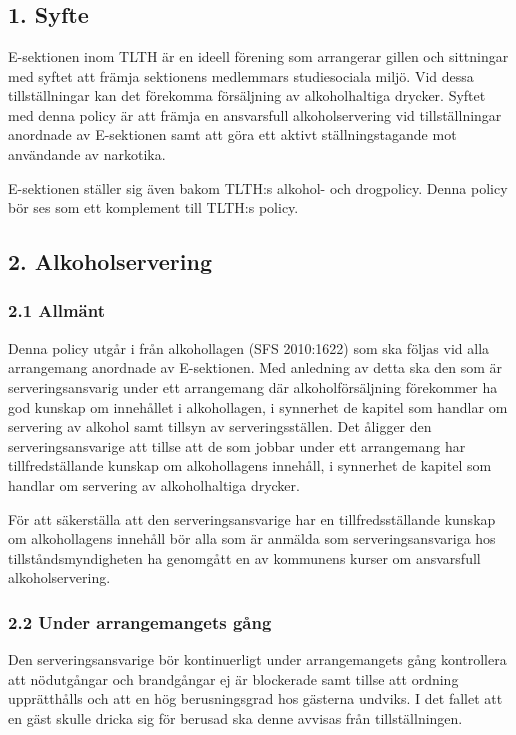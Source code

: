\documentclass[10pt]{article}
\begin{document}
\section*{\doctitle}
\subsection*{1. Syfte}
E-sektionen inom TLTH är en ideell förening som arrangerar gillen och sittningar med syftet att främja sektionens medlemmars studiesociala miljö. Vid dessa tillställningar kan det förekomma försäljning av alkoholhaltiga drycker. Syftet med denna policy är att främja en ansvarsfull alkoholservering vid tillställningar anordnade av E-sektionen samt att göra ett aktivt ställningstagande mot användande av narkotika.

E-sektionen ställer sig även bakom TLTH:s alkohol- och drogpolicy. Denna policy bör ses som ett komplement till TLTH:s policy.

\subsection*{2. Alkoholservering}
\subsubsection*{2.1 Allmänt}
Denna policy utgår i från alkohollagen (SFS 2010:1622) som ska följas vid alla arrangemang anordnade av E-sektionen. Med anledning av detta ska den som är serveringsansvarig under ett arrangemang där alkoholförsäljning förekommer ha god kunskap om innehållet i alkohollagen, i synnerhet de kapitel som handlar om servering av alkohol samt tillsyn av serveringsställen. Det åligger den serveringsansvarige att tillse att de som jobbar under ett arrangemang har tillfredställande kunskap om alkohollagens innehåll, i synnerhet de kapitel som handlar om servering av alkoholhaltiga drycker.

För att säkerställa att den serveringsansvarige har en tillfredsställande kunskap om alkohollagens innehåll bör alla som är anmälda som serveringsansvariga hos tillståndsmyndigheten ha genomgått en av kommunens kurser om ansvarsfull alkoholservering.

\subsubsection*{2.2 Under arrangemangets gång}
Den serveringsansvarige bör kontinuerligt under arrangemangets gång kontrollera att nödutgångar och brandgångar ej är blockerade samt tillse att ordning upprätthålls och att en hög berusningsgrad hos gästerna undviks. I det fallet att en gäst skulle dricka sig för berusad ska denne avvisas från tillställningen.
\end{document}

